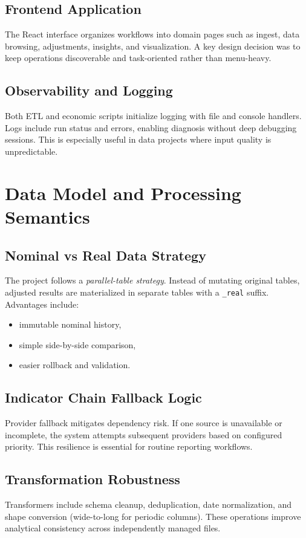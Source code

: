 \documentclass[12pt,a4paper]{report}
\begin{document}
\section{Frontend Application}
The React interface organizes workflows into domain pages such as ingest, data browsing, adjustments, insights, and visualization. A key design decision was to keep operations discoverable and task-oriented rather than menu-heavy.

\section{Observability and Logging}
Both ETL and economic scripts initialize logging with file and console handlers. Logs include run status and errors, enabling diagnosis without deep debugging sessions. This is especially useful in data projects where input quality is unpredictable.

\chapter{Data Model and Processing Semantics}
\section{Nominal vs Real Data Strategy}
The project follows a \emph{parallel-table strategy}. Instead of mutating original tables, adjusted results are materialized in separate tables with a \texttt{\_real} suffix. Advantages include:
\begin{itemize}[leftmargin=1.5em]
  \item immutable nominal history,
  \item simple side-by-side comparison,
  \item easier rollback and validation.
\end{itemize}

\section{Indicator Chain Fallback Logic}
Provider fallback mitigates dependency risk. If one source is unavailable or incomplete, the system attempts subsequent providers based on configured priority. This resilience is essential for routine reporting workflows.

\section{Transformation Robustness}
Transformers include schema cleanup, deduplication, date normalization, and shape conversion (wide-to-long for periodic columns). These operations improve analytical consistency across independently managed files.
\end{document}
